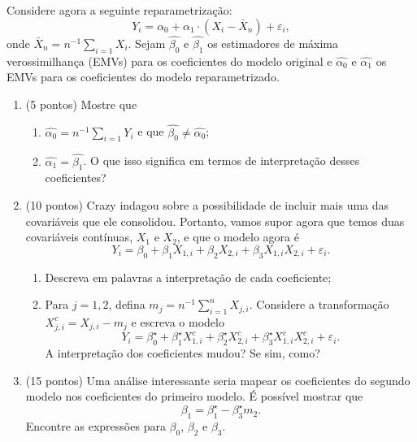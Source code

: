 \documentclass[a4paper,10pt, notitlepage]{report}
\newif\ifanswers
\begin{document}
Considere agora a seguinte reparametrização:
\begin{equation*}
    Y_i = \alpha_0 + \alpha_1 \cdot (X_i - \bar{X}_n) + \varepsilon_i,
\end{equation*}
onde $\bar{X}_n = n^{-1}\sum_{i=1} X_i$.
Sejam $\widehat{\beta_0}$ e $\widehat{\beta_1}$ os estimadores de máxima verossimilhança (EMVs) para os coeficientes do modelo original e  $\widehat{\alpha_0}$ e $\widehat{\alpha_1}$ os EMVs para os coeficientes do modelo reparametrizado.

\begin{enumerate}[label=\alph*)]
 \item (5 pontos) Mostre que
 \begin{enumerate}
     \item $\widehat{\alpha_0} = n^{-1}\sum_{i=1} Y_i$ e que 
     $ \widehat{\beta_0} \neq \widehat{\alpha_0}$;
     \item $\widehat{\alpha_1} = \widehat{\beta_1}$.
     O que isso significa em termos de interpretação desses coeficientes?
 \end{enumerate}
 \item (10 pontos) Crazy indagou sobre a possibilidade de incluir mais uma das covariáveis que ele consolidou. Portanto, vamos supor agora que temos duas covariáveis contínuas, $X_1$ e $X_2$, e que  o modelo agora é
 \begin{equation*}
     Y_i = \beta_0 + \beta_1 X_{1, i} + \beta_2 X_{2, i} + \beta_3 X_{1, i} X_{2, i} + \varepsilon_i.
 \end{equation*}
 \begin{enumerate}
     \item Descreva em palavras a interpretação de cada coeficiente;
     \item Para $j=1, 2$, defina $m_j = n^{-1}\sum_{i=1}^n X_{j, i}$.
     Considere a transformação $X_{j, i}^{c} = X_{j, i} - m_{j}$  e escreva o modelo
     \begin{equation*}
              Y_i = \beta^{\star}_0 + \beta^{\star}_1 X^{c}_{1, i} + \beta^{\star}_2 X^{c}_{2, i} + \beta^{\star}_3 X^{c}_{1, i} X^{c}_{2, i} + \varepsilon_i.
     \end{equation*}
     A interpretação dos coeficientes mudou? Se sim, como?
 \end{enumerate}
 \item (15 pontos) Uma análise interessante seria mapear os coeficientes do segundo modelo nos coeficientes do primeiro modelo.
 É possível mostrar que 
 \begin{equation*}
     \beta_1 = \beta^{\star}_1 - \beta^{\star}_{3}m_2.
 \end{equation*}
 Encontre as expressões para $\beta_0$, $\beta_2$ e $\beta_3$.
\end{enumerate}
\ifanswers

\fi
\end{document}

